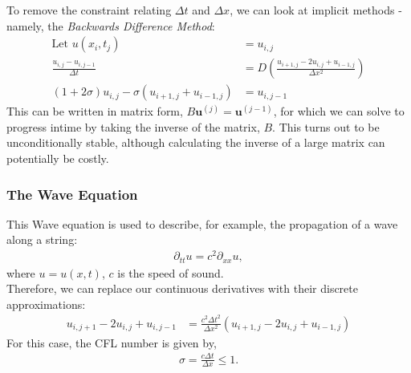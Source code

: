 \documentclass[11pt,a4paper]{report}
\begin{document}
			To remove the constraint relating $\Delta t$ and $\Delta x$, we can look at implicit methods - namely, the \textit{Backwards Difference Method}:
			\begin{align}
				\text{Let } u(x_i,t_j) &= u_{i,j} \\
				\frac{u_{i,j} - u_{i,j-1}}{\Delta t} &= D \left(\frac{u_{i+1,j} - 2u_{i,j} + u_{i-1,j}}{\Delta x^2} \right) \\
				(1+2\sigma) u_{i,j} - \sigma(u_{i+1,j} + u_{i-1,j}) &= u_{i,j-1}
			\end{align}
			This can be written in matrix form, $B\mathbf{u}^{(j)} = \mathbf{u}^{(j-1)}$, for which we can solve to progress intime by taking the inverse of the matrix, $B$. This turns out to be unconditionally stable, although calculating the inverse of a large matrix can potentially be costly. 
			
		\subsubsection{The Wave Equation}
			This Wave equation is used to describe, for example, the propagation of a wave along a string:
			\begin{align}
				\partial_{tt} u = c^2 \partial_{xx} u,
			\end{align}
			where $u=u(x,t)$, $c$ is the speed of sound. \\
			
			Therefore, we can replace our continuous derivatives with their discrete approximations:
			\begin{align}
				u_{i,j+1} - 2u_{i,j} + u_{i,j-1} &= \frac{c^2\Delta t^2}{\Delta x^2} \left(u_{i+1,j} - 2u_{i,j} + u_{i-1,j}\right) 
			\end{align}
			For this case, the CFL number is given by,
			\begin{align}
				\sigma = \frac{c\Delta t}{\Delta x} \leq 1.
			\end{align}
\end{document}
